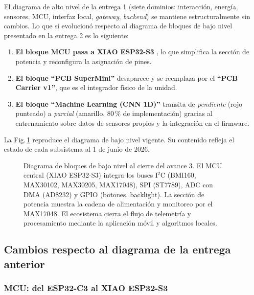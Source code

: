\documentclass[letterpaper,11pt]{article}
\newcommand{\rfigura}[1]{Fig.\,\ref{#1}}
\begin{document}
El diagrama de alto nivel de la entrega 1 (siete dominios: interacción, energía, sensores, MCU, interfaz local, \textit{gateway}, \textit{backend}) se mantiene estructuralmente sin cambios. Lo que sí evolucionó respecto al diagrama de bloques de bajo nivel presentado en la entrega 2 es lo siguiente:
\begin{enumerate}
    \item \textbf{El bloque MCU pasa a XIAO ESP32-S3} \cite{esp32s3_ds_2024}, lo que simplifica la sección de potencia y reconfigura la asignación de pines.
    \item \textbf{El bloque ``PCB SuperMini''} desaparece y se reemplaza por el \textbf{``PCB Carrier v1''}, que es el integrador físico de la unidad.
    \item \textbf{El bloque ``Machine Learning (CNN 1D)''} transita de \textit{pendiente} (rojo punteado) a \textit{parcial} (amarillo, 80\,\% de implementación) gracias al entrenamiento sobre datos de sensores propios y la integración en el firmware.
\end{enumerate}

La \rfigura{fig:lownivel_e3} reproduce el diagrama de bajo nivel vigente. Su contenido refleja el estado de cada subsistema al 1 de junio de 2026.

\begin{figure}[H]
    \centering
    \resizebox{\textwidth}{!}{}
    \caption{Diagrama de bloques de bajo nivel al cierre del avance 3. El MCU central (XIAO ESP32-S3) integra los buses I$^2$C (BMI160, MAX30102, MAX30205, MAX17048), SPI (ST7789), ADC con DMA (AD8232) y GPIO (botones, backlight). La sección de potencia muestra la cadena de alimentación y monitoreo por el MAX17048. El ecosistema cierra el flujo de telemetría y procesamiento mediante la aplicación móvil y algoritmos locales.}
    \label{fig:lownivel_e3}
\end{figure}

\subsection{Cambios respecto al diagrama de la entrega anterior}

\subsubsection{MCU: del ESP32-C3 al XIAO ESP32-S3}
\end{document}
